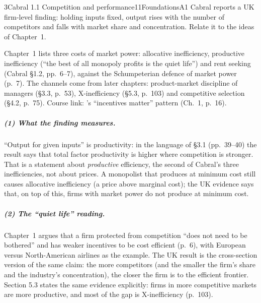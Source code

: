 \begin{exsol}{3}{Cabral 1.1 Competition and performance}{11}{Foundations}{A1}
\asked Cabral reports a UK firm-level finding: holding inputs fixed, output rises with the number
of competitors and falls with market share and concentration. Relate it to the ideas of
Chapter~1.

\method Chapter~1 lists three costs of market power: allocative inefficiency, productive
inefficiency (``the best of all monopoly profits is the quiet life'') and rent seeking (Cabral
\S1.2, pp.~6--7), against the Schumpeterian defence of market power (p.~7). The channels come from
later chapters: product-market discipline of managers (\S3.3, p.~53), X-inefficiency (\S5.3,
p.~103) and competitive selection (\S4.2, p.~75). Course link: \MR's ``incentives matter'' pattern
(Ch.~1, p.~16).

\solution
\subparagraph{(1) What the finding measures.} ``Output for given inputs'' is productivity: in the
language of \S3.1 (pp.~39--40) the result says that total factor productivity is higher where
competition is stronger. That is a statement about \emph{productive} efficiency, the second of
Cabral's three inefficiencies, not about prices. A monopolist that produces at minimum cost
still causes allocative inefficiency (a price above marginal cost); the UK evidence says that,
on top of this, firms with market power do not produce at minimum cost.

\subparagraph{(2) The ``quiet life'' reading.} Chapter~1 argues that a firm protected from
competition ``does not need to be bothered'' and has weaker incentives to be cost efficient
(p.~6), with European versus North-American airlines as the example. The UK result is the
cross-section version of the same claim: the more competitors (and the smaller the firm's share
and the industry's concentration), the closer the firm is to the efficient frontier. Section
5.3 states the same evidence explicitly: firms in more competitive markets are more productive,
and most of the gap is X-inefficiency (p.~103).


\end{exsol}
